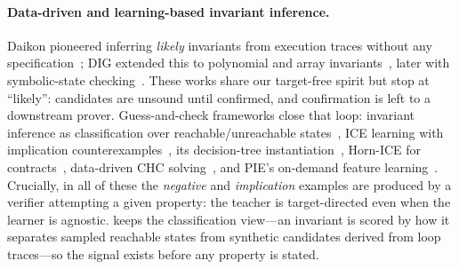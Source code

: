 \paragraph{Data-driven and learning-based invariant inference.}
Daikon pioneered inferring \emph{likely} invariants from execution traces without any specification~\citep{daikon}; DIG extended this to polynomial and array invariants~\citep{nguyen2012using}, later with symbolic-state checking~\citep{nla2019,nguyen2017syminfer}.
These works share our target-free spirit but stop at ``likely'': candidates are unsound until confirmed, and confirmation is left to a downstream prover.
Guess-and-check frameworks close that loop: invariant inference as classification over reachable/unreachable states~\citep{sharma2012interpolants,sharma2013data}, ICE learning with implication counterexamples~\citep{garg2014ice}, its decision-tree instantiation~\citep{garg2016learning}, Horn-ICE for contracts~\citep{ezudheen2018horn}, data-driven CHC solving~\citep{zhu2018data}, and PIE's on-demand feature learning~\citep{padhi2016pie}.
Crucially, in all of these the \emph{negative} and \emph{implication} examples are produced by a verifier attempting a given property: the teacher is target-directed even when the learner is agnostic.
\sam{} keeps the classification view---an invariant is scored by how it separates sampled reachable states from synthetic candidates derived from loop traces---so the signal exists before any property is stated.

